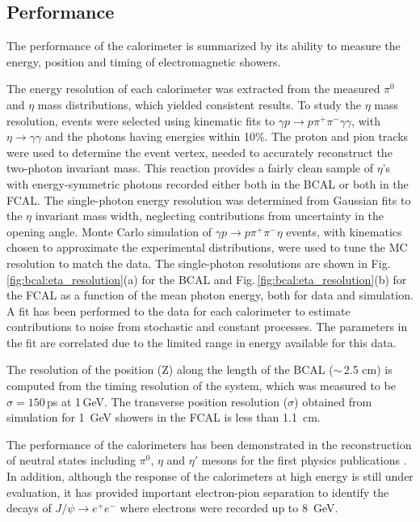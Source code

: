 \subsection{Performance \label{sec:calperformance}}
The performance of the calorimeter is summarized by its ability to measure the energy, position and timing of electromagnetic showers.

The energy resolution of each calorimeter was extracted from the measured $\pi^0$ and $\eta$ mass distributions, which yielded consistent results. 
To study the $\eta$ mass resolution, events were selected using kinematic fits to $\gamma p \rightarrow p \pi^+ \pi^- \gamma \gamma$, with $\eta\rightarrow \gamma\gamma$ and the photons having energies within 10\%.
The proton and pion tracks were used to determine the event vertex, needed to accurately reconstruct the two-photon invariant mass.
This reaction provides a fairly clean sample of $\eta$'s with energy-symmetric photons recorded either both in the BCAL or both in the FCAL. 
The single-photon energy resolution was determined from Gaussian fits to the $\eta$ invariant mass width, neglecting contributions from uncertainty in the opening angle.
Monte Carlo simulation of $\gamma p \rightarrow p \pi^+ \pi^- \eta$ events, with kinematics chosen to approximate the experimental distributions, were used to tune the MC resolution to match the data. 
The single-photon resolutions are shown in Fig.\,\ref{fig:bcal:eta_resolution}(a) for the BCAL and Fig.\,\ref{fig:bcal:eta_resolution}(b) for the FCAL as a function of the mean photon energy, both for data and simulation.
A fit has been performed to the data for each calorimeter to estimate contributions to noise from stochastic and constant processes.  The parameters in the fit are correlated due to the limited range in energy available for this data.

The resolution of the position (Z) along the length of the BCAL ($\sim$\,2.5 cm) is computed from the timing resolution of the system, which was measured to be $\sigma=150$\,ps at 1\,GeV. The transverse position resolution ($\sigma$) obtained from simulation for 1~GeV showers in the FCAL is less than 1.1~cm.

The performance of the calorimeters has been demonstrated in the reconstruction of neutral states including $\pi^0$, $\eta$ and $\eta'$ mesons for the first \gx{} physics publications \cite{AlGhoul:2017nbp,Adhikari:2019gfa}. In addition, although the response of the calorimeters at high energy is still under evaluation, it has provided important electron-pion separation to identify the decays of $J/\psi\rightarrow e^+e^-$ \cite{Ali:2019lzf} where electrons were recorded up to 8~GeV. 

